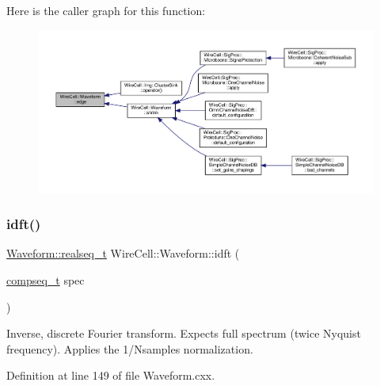 Here is the caller graph for this function\+:
\nopagebreak
\begin{figure}[H]
\begin{center}
\leavevmode
\includegraphics[width=350pt]{namespace_wire_cell_1_1_waveform_ae368e58f014b0d634028afcbb05887cb_icgraph}
\end{center}
\end{figure}
\mbox{\label{namespace_wire_cell_1_1_waveform_a69255dad704fcb71fa53745e90a2f0e1}} 
\subsubsection{\texorpdfstring{idft()}{idft()}}
{\footnotesize\ttfamily \hyperlink{namespace_wire_cell_1_1_waveform_a479175e541c8545e87cd8063b74b6956}{Waveform\+::realseq\+\_\+t} Wire\+Cell\+::\+Waveform\+::idft (\begin{DoxyParamCaption}\item[{\hyperlink{namespace_wire_cell_1_1_waveform_a7e4a8d371f774438bb360e7d1dcb583a}{compseq\+\_\+t}}]{spec }\end{DoxyParamCaption})}

Inverse, discrete Fourier transform. Expects full spectrum (twice Nyquist frequency). Applies the 1/\+Nsamples normalization. 

Definition at line 149 of file Waveform.\+cxx.


